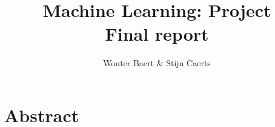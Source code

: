 \documentclass[11pt,a4paper,titlepage]{article}
\author{Wouter Baert \& Stijn Caerts}
\title{Machine Learning: Project \\ \small{Final report}}
\begin{document}
	\maketitle
	
	\section*{Abstract}
	
	\tableofcontents
	\newpage
	
	
	
	
	
	
	
	\newpage
	
	
\end{document}
